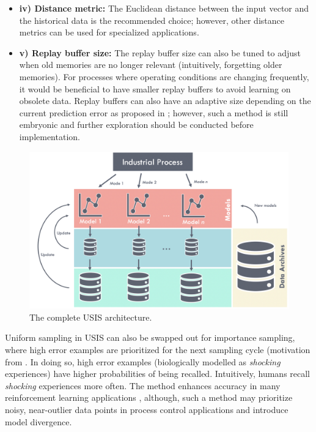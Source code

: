 \begin{itemize}
    \item \textbf{iv) Distance metric: } The Euclidean distance between the input vector and the historical data is the recommended choice; however, other distance metrics can be used for specialized applications.
    
    
    \item \textbf{v) Replay buffer size: } The replay buffer size can also be tuned to adjust when old memories are no longer relevant (intuitively, forgetting older memories).  For processes where operating conditions are changing frequently, it would be beneficial to have smaller replay buffers to avoid learning on obsolete data.  Replay buffers can also have an adaptive size depending on the current prediction error as proposed in \cite{eff_of_er}; however, such a method is still embryonic and further exploration should be conducted before implementation.
\end{itemize}

\begin{figure}[h]
    \centering
    \includegraphics[width=\textwidth]{images/ch2/02USIS_Complete.jpeg}
    \caption{The complete USIS architecture.}
    \label{fig:02USIS_Complete}
\end{figure}

Uniform sampling in USIS can also be swapped out for importance sampling, where high error examples are prioritized for the next sampling cycle (motivation from \cite{prioritize_exp_replay}. In doing so, high error examples (biologically modelled as \textit{shocking} experiences) have higher probabilities of being recalled.  Intuitively, humans recall \textit{shocking} experiences more often. The method enhances accuracy in many reinforcement learning applications \cite{dqn, er1, er2}, although, such a method may prioritize noisy, near-outlier data points in process control applications and introduce model divergence.

